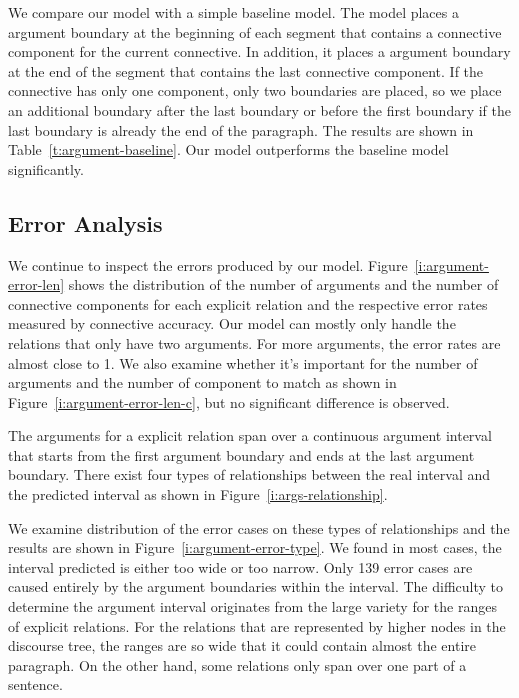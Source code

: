 

We compare our model with a simple baseline model. The model places a argument
boundary at the beginning of each segment that contains a connective component for
the current connective. In addition, it places a argument boundary at the
end of the segment that contains the last connective component. If the connective
has only one component, only two boundaries are placed, so we place an additional
boundary after the last boundary or before the first boundary if
the last boundary is already the end of the paragraph. The results are shown
in Table~\ref{t:argument-baseline}. Our model outperforms the baseline model
significantly.



\subsection{Error Analysis}

We continue to inspect the errors produced by our model.
Figure~\ref{i:argument-error-len} shows the distribution of the number
of arguments and the number of connective components for each explicit relation
and the respective error rates measured by connective accuracy.
Our model can mostly only handle the relations
that only have two arguments. For more arguments, the error rates are almost
close to 1. We also examine whether it's important for
the number of arguments and the number of component to match as shown in
Figure~\ref{i:argument-error-len-c}, but no significant difference is observed.



The arguments for a explicit relation span over a continuous argument interval that
starts from the first argument boundary and ends at the last argument boundary.
There exist four types of relationships between the real interval and the predicted
interval as shown in Figure~\ref{i:args-relationship}.



We examine distribution of the error cases on these types of relationships and the
results are shown in Figure~\ref{i:argument-error-type}. We found in most cases,
the interval predicted is either too wide or too narrow.
Only 139 error cases are caused entirely by the argument boundaries within the
interval. The difficulty to determine the argument interval originates from
the large variety for the ranges of explicit relations. For the relations that
are represented by higher nodes in the discourse tree,
the ranges are so wide that it could contain almost the entire paragraph.
On the other hand, some relations only span over one part of a sentence.

